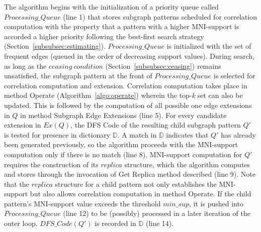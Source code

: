 The algorithm begins with the initialization of a priority queue called
$Processing\_Queue$ (line 1) that stores subgraph patterns scheduled for
correlation computation with the property that a pattern with a higher
MNI-support is accorded a higher priority following the best-first search
strategy (Section~\ref{subsubsec:estimating}). $Processing\_Queue$ is
initialized with the set of frequent edges (queued in the order of decreasing
support values). During search, as long as the $ceasing\ condition$
(Section~\ref{subsubsec:ceasing}) remains unsatisfied, the subgraph pattern at
the front of $Processing\_Queue$ is selected for correlation computation and
extension. Correlation computation takes place in method {\sf Operate}
(Algorithm~\ref{algo:operate}) wherein the top-\textit{k} set can also be
updated. This is followed by the computation of all possible one edge extensions
in $Q$ in method {\sf Subgraph Edge Extensions} (line 5). For every candidate
extension in $Ex(Q)$, the DFS Code of the resulting child subgraph pattern $Q'$
is tested for presence in dictionary $\mathbb{D}$. A match in $\mathbb{D}$
indicates that $Q'$ has already been generated previously, so the algorithm
proceeds with the MNI-support computation only if there is no match (line 8).
MNI-support computation for $Q'$ requires the construction of its $replica$
structure, which the algorithm computes and stores through the invocation of
{\sf Get Replica} method described (line 9). Note that the $replica$ structure
for a child pattern not only establishes the MNI-support but also allows
correlation computation in method {\sf Operate}. If the child pattern's
MNI-support value exceeds the threshold $min\_sup$, it is pushed into
$Processing\_Queue$ (line 12) to be (possibly) processed in a later iteration of
the outer loop. $DFS\_Code(Q')$ is recorded in $\mathbb{D}$ (line 14).

